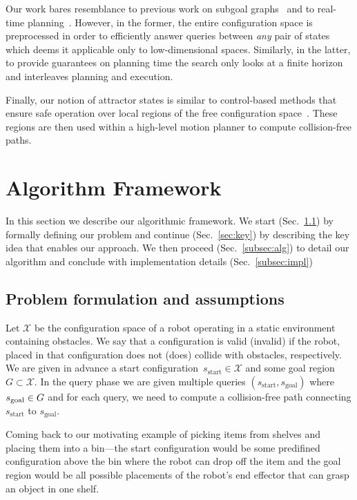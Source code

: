 \documentclass[letterpaper]{article} %
\newcommand{\calX}{\ensuremath{\mathcal{X}}\xspace}
\newcommand{\sStart}{\ensuremath{s_{\text{start}}\xspace}}
\begin{document}
Our work bares resemblance to previous work on 
subgoal graphs~\cite{UK17,UK18} and to real-time planning~\cite{KL06,KS09,K90}.
However, in the former, the entire configuration space is preprocessed in order to efficiently answer queries between \emph{any} pair of states which deems it applicable only to low-dimensional spaces.
Similarly, in the latter, to provide guarantees on planning time the search only looks at a finite horizon and interleaves planning and execution.

Finally, our notion of attractor states is similar to control-based methods that  ensure safe operation over local regions of the free configuration space~\cite{CRC03,CCR06}.
These regions are then used within a high-level motion planner to compute collision-free paths.

\section{Algorithm Framework}
\label{sec:alg}
In this section we describe our algorithmic framework. We start (Sec.~\ref{sec:pdef}) by formally defining our problem and continue (Sec.~\ref{sec:key}) by describing the key idea that enables our approach.
We then proceed (Sec.~\ref{subsec:alg}) to detail our algorithm and conclude with implementation details (Sec.~\ref{subsec:impl})

\subsection{Problem formulation and assumptions}
\label{sec:pdef}
Let $\calX$ be the configuration space of a robot operating in a static environment containing obstacles.
We say that a configuration is valid (invalid) if the robot, placed in that configuration does not (does) collide with obstacles, respectively.
We are given in advance a start configuration~$\sStart \in \calX$ and some goal region~$G \subset \calX$.
In the query phase we are given multiple queries $(\sStart, s_{\text{goal}})$ where $s_{\rm goal} \in G$ and for each query, we need to compute a collision-free path connecting $\sStart$ to $s_{\text{goal}}$.

Coming back to our motivating example of picking items from  shelves and placing them into a bin---the start configuration would be some predifined configuration above the bin where the robot can drop off the item and the goal region would be all possible placements of the robot's end effector that can grasp an object in one shelf.
\end{document}
